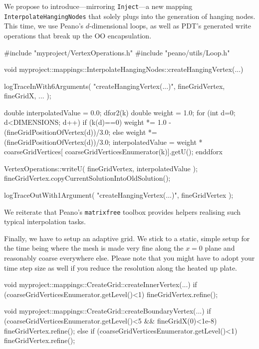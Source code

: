 We propose to introduce---mirroring \texttt{Inject}---a new mapping
\texttt{InterpolateHangingNodes} that solely plugs into the generation of hanging nodes.
This time, we use Peano's $d$-dimensional loops, as well as PDT's generated
write operations that break up the OO encapsulation.

\begin{code}
#include "myproject/VertexOperations.h"
#include "peano/utils/Loop.h"

void myproject::mappings::InterpolateHangingNodes::createHangingVertex(...) {
  logTraceInWith6Arguments( "createHangingVertex(...)", fineGridVertex, fineGridX, ... );

  double interpolatedValue = 0.0;
  dfor2(k)
    double weight = 1.0;
    for (int d=0; d<DIMENSIONS; d++) {
      if (k(d)==0) {
        weight *= 1.0 - (fineGridPositionOfVertex(d))/3.0;
      }
      else {
        weight *= (fineGridPositionOfVertex(d))/3.0;
      }
    }
    interpolatedValue = weight * coarseGridVertices[ coarseGridVerticesEnumerator(k)].getU();
  enddforx

  VertexOperations::writeU( fineGridVertex, interpolatedValue );
  fineGridVertex.copyCurrentSolutionIntoOldSolution();

  logTraceOutWith1Argument( "createHangingVertex(...)", fineGridVertex );
}
\end{code}

\noindent
We reiterate that Peano's \texttt{matrixfree} toolbox provides helpers realising
such typical interpolation tasks.

Finally, we have to setup an adaptive grid. We stick to a static, simple setup
for the time being where the mesh is made very fine along the $x=0$ plane and
reasonably coarse everywhere else.
Please note that you might have to adopt your time step size as well if you
reduce the resolution along the heated up plate. 

\begin{code}
void myproject::mappings::CreateGrid::createInnerVertex(...) {
 if (coarseGridVerticesEnumerator.getLevel()<1) {
  fineGridVertex.refine();
 }
}

void myproject::mappings::CreateGrid::createBoundaryVertex(...) {
 if (coarseGridVerticesEnumerator.getLevel()<5 && fineGridX(0)<1e-8) {
  fineGridVertex.refine();
 }
 else if (coarseGridVerticesEnumerator.getLevel()<1) {
  fineGridVertex.refine();
 }
}
\end{code}


